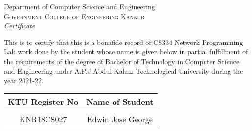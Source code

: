\newpage
\thispagestyle{empty}
\vspace*{\fill}
\begin{onehalfspace}
\begin{center}

	\huge{Department of Computer Science and Engineering}\\[0.5cm]
	\normalsize \textsc{Government College of Engineering Kannur}\\[2.0cm]

	\emph{\LARGE Certificate}\\[1.0cm]
\end{center}

\normalsize This is to certify that this is a bonafide record of CS334 Network Programming Lab work done by the student whose name is given below in partial fulfillment of the requirements of the degree of Bachelor of Technology in Computer Science and Engineering under A.P.J.Abdul Kalam Technological University during the year 2021-22.\\[1.0cm]

\begin{table}[h]
	\centering
	\begin{tabular}{cc}
		KTU Register No & Name of Student
		\\ \hline \\
		KNR18CS027      & Edwin Jose George
	\end{tabular}
\end{table}
\vspace{2cm}


\begin{table}[h]
	\centering
\end{table}
\end{onehalfspace}
\vspace*{\fill}
